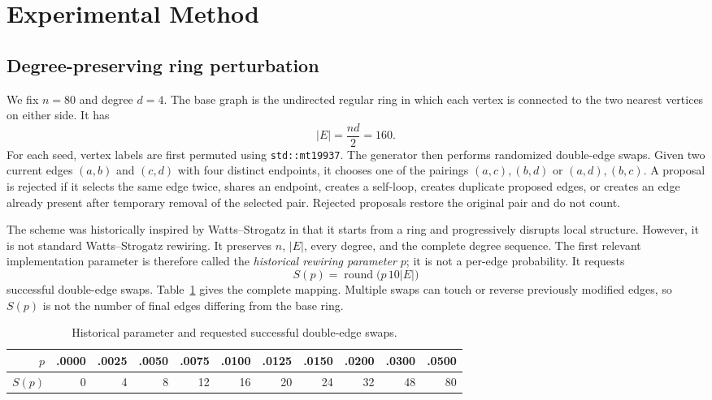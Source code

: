 \documentclass[11pt]{article}
\begin{document}
\section{Experimental Method}

\subsection{Degree-preserving ring perturbation}

We fix $n=80$ and degree $d=4$. The base graph is the undirected regular ring in which each vertex is connected to the two nearest vertices on either side. It has
\[
|E|=\frac{nd}{2}=160.
\]
For each seed, vertex labels are first permuted using \texttt{std::mt19937}. The generator then performs randomized double-edge swaps. Given two current edges $(a,b)$ and $(c,d)$ with four distinct endpoints, it chooses one of the pairings $(a,c),(b,d)$ or $(a,d),(b,c)$. A proposal is rejected if it selects the same edge twice, shares an endpoint, creates a self-loop, creates duplicate proposed edges, or creates an edge already present after temporary removal of the selected pair. Rejected proposals restore the original pair and do not count.

The scheme was historically inspired by Watts--Strogatz in that it starts from a ring and progressively disrupts local structure. However, it is not standard Watts--Strogatz rewiring. It preserves $n$, $|E|$, every degree, and the complete degree sequence. The first relevant implementation parameter is therefore called the \emph{historical rewiring parameter $p$}; it is not a per-edge probability. It requests
\[
S(p)=\operatorname{round}\bigl(p\,10|E|\bigr)
\]
successful double-edge swaps. Table~\ref{tab:mapping} gives the complete mapping. Multiple swaps can touch or reverse previously modified edges, so $S(p)$ is not the number of final edges differing from the base ring.

\begin{table}[t]
\centering
\caption{Historical parameter and requested successful double-edge swaps.}
\label{tab:mapping}
\begin{tabular}{rrrrrrrrrrr}
\toprule
$p$ & .0000 & .0025 & .0050 & .0075 & .0100 & .0125 & .0150 & .0200 & .0300 & .0500\\
\midrule
$S(p)$ & 0 & 4 & 8 & 12 & 16 & 20 & 24 & 32 & 48 & 80\\
\bottomrule
\end{tabular}
\end{table}
\end{document}
